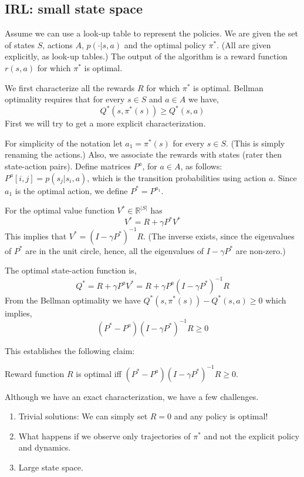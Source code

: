 \subsection{IRL: small state space}

Assume we can use a look-up table to represent the policies. We are
given the set of states $S$, actions $A$, $p(\cdot|s,a)$ and the
optimal policy $\pi^*$. (All are given explicitly, as look-up
tables.) The output of the algorithm is a reward function $r(s,a)$
for which $\pi^*$ is optimal.

We first characterize all the rewards $R$ for which $\pi^*$ is
optimal. Bellman optimality requires that for every $s\in S$ and
$a\in A$ we have,
\[
Q^*(s,\pi^*(s))\geq Q^*(s,a)
\]
First we will try to get a more explicit characterization.

For simplicity of the notation let $a_1=\pi^*(s)$ for every $s\in
S$. (This is simply renaming the actions.) Also, we associate the rewards with states (rater
then state-action pairs). Define matrices $P^a$,
for $a\in A$, as follows: $P^a[i,j]=p(s_j|s_i,a)$, which is the
transition probabilities using action $a$. Since $a_1$ is the
optimal action, we define $P^*=P^{a_1}$.

For the optimal value function $V^*\in \mathbb{R}^{|S|}$ has
\[
V^*=R+\gamma P^*V^*
\]
This implies that $V^*=(I-\gamma P^*)^{-1}R$. (The inverse exists,
since the eigenvalues of $P^*$ are in the unit circle, hence, all
the eigenvalues of $I-\gamma P^*$ are non-zero.)

The optimal state-action function is,
\[
Q^*=R+\gamma P^a V^*=R+\gamma P^a (I-\gamma P^*)^{-1}R
\]
From the Bellman optimality we have $Q^*(s,\pi^*(s))- Q^*(s,a)\geq
0$ which implies,
\[
(P^*-P^a) (I-\gamma P^*)^{-1}R\geq 0
\]

This establishes the following claim:
\begin{claim}
Reward function $R$ is optimal iff $(P^*-P^a) (I-\gamma
P^*)^{-1}R\geq 0$.
\end{claim}

Although we have an exact characterization, we have a few
challenges.
\begin{enumerate}
\item
Trivial solutions: We can simply set $R=0$ and any policy is
optimal!
\item
What happens if we observe only trajectories of $\pi^*$ and not the
explicit policy and dynamics.
\item
Large state space.
\end{enumerate}

